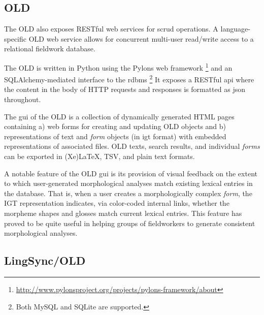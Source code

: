 \documentclass[11pt]{article}
\begin{document}
\subsection{OLD}\label{sec:old}

The OLD also exposes RESTful web services for \gls{scrud} operations. 
A language-specific OLD web service allows for concurrent
multi-user read/write access to a relational fieldwork database. 




The OLD is written in Python using the Pylons web framework%
\footnote{\url{http://www.pylonsproject.org/projects/pylons-framework/about}} %
and an SQLAlchemy-mediated interface to the \gls{rdbms}%
\footnote{Both MySQL and SQLite are supported.} %
It exposes a RESTful \gls{api} where the content in the body of HTTP 
requests and responses is formatted as \gls{json} throughout.%



The \gls{gui} of the OLD is a collection of dynamically generated HTML pages
containing a) web forms for creating and updating OLD objects and b)
representations of text and \emph{form} objects (in \gls{igt} format) with
embedded representations of associated files. OLD texts, search results, and
individual \emph{forms} can be exported in (Xe)LaTeX, TSV, and plain text
formats.

A notable feature of the OLD \gls{gui} is its provision of visual feedback on the
extent to which user-generated morphological analyses match existing lexical
entries in the database. That is, when a user creates a morphologically complex
\emph{form}, the IGT representation indicates, via color-coded internal links,
whether the morpheme shapes and glosses match current lexical entries. This
feature has proved to be quite useful in helping groups of fieldworkers to
generate consistent morphological analyses.



\subsection{LingSync/OLD}
\end{document}
